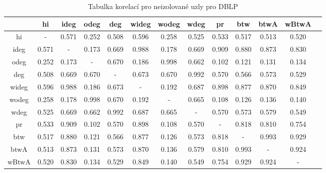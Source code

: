 \documentclass{bakalarka}
\begin{document}
\begin{table}[!ht]
\centering
\caption{Tabulka korelací pro neizolované uzly pro DBLP}
\label{tab:corr1}
\begin{sideways}
\begin{tabular}{c|cccccccccccc}
\toprule
&hi  &ideg &odeg &deg  &wideg&wodeg&wdeg &pr   &btw  &btwA &wBtwA\\
\midrule
hi   &  -  &0.571&0.252&0.508&0.596&0.258&0.525&0.533&0.517&0.513&0.520\\
ideg &0.571&  -  &0.173&0.669&0.988&0.178&0.669&0.909&0.880&0.873&0.830\\
odeg &0.252&0.173&  -  &0.670&0.186&0.998&0.662&0.102&0.121&0.131&0.134\\
deg  &0.508&0.669&0.670&  -  &0.673&0.670&0.992&0.570&0.566&0.573&0.529\\
wideg&0.596&0.988&0.186&0.673&  -  &0.192&0.687&0.898&0.877&0.870&0.849\\
wodeg&0.258&0.178&0.998&0.670&0.192&  -  &0.665&0.108&0.126&0.136&0.140\\
wdeg &0.525&0.669&0.662&0.992&0.687&0.665&  -  &0.570&0.573&0.579&0.549\\
pr   &0.533&0.909&0.102&0.570&0.898&0.108&0.570&  -  &0.818&0.810&0.754\\
btw  &0.517&0.880&0.121&0.566&0.877&0.126&0.573&0.818&  -  &0.993&0.929\\
btwA &0.513&0.873&0.131&0.573&0.870&0.136&0.579&0.810&0.993&  -  &0.924\\
wBtwA&0.520&0.830&0.134&0.529&0.849&0.140&0.549&0.754&0.929&0.924&  -  \\
\bottomrule
\end{tabular}
\end{sideways}
\end{table}
\end{document}

